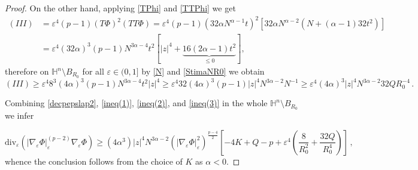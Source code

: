 \documentclass[10pt]{amsart}
\numberwithin{equation}{section}
\theoremstyle{definition}
\newcommand{\eps}{\varepsilon}
\newcommand{\He}{\mathbb{H}}
\begin{document}
\begin{proof}
\noindent On the other hand, applying \eqref{TPhi} and \eqref{TTPhi} we get
\begin{equation}
\label{eq:III}
\begin{aligned}(III) &= \eps^4 (p-1) (T\Phi)^2 (TT\Phi) = \eps^4 (p-1) (32 \alpha N^{\alpha-1}t)^2 \left[32 \alpha N^{\alpha-2} (N+(\alpha-1)32t^2)\right]\\
&= \eps^4 (32 \alpha)^3 (p-1) N^{3\alpha -4} t^2 \left[ |z|^4 + \underbrace{16 (2\alpha -1)t^2}_{\leq 0} \right], 
\end{aligned}
\end{equation}
therefore on $\He^n\setminus B_{R_0}$ for all $\varepsilon \in (0,1]$ by \eqref{N} and \eqref{StimaNR0} we obtain
\begin{equation}
\label{ineq(3)}
(III)\geq \varepsilon^4 8^3 (4\alpha)^3 (p-1) N^{3\alpha-4} t^2 |z|^4\geq \varepsilon^4 32 (4\alpha)^3 (p-1)  |z|^4 N^{3\alpha-2}   N^{-1}\geq  \varepsilon^4 (4\alpha)^3  |z|^4 N^{3\alpha-2} 32 Q   R_0^{-4}\,.
\end{equation}

Combining \eqref{decpepslap2}, \eqref{ineq(1)}, \eqref{ineq(2)}, and \eqref{ineq(3)} in the whole $\He^n\setminus B_{R_0}$ we infer

 \[ \mathrm{div}_{\eps} \left( |\nabla_{\eps} \Phi|_{\eps}^{(p-2)}\nabla_{\eps}\Phi \right) \geq(4\alpha^3) |z|^4 N^{3\alpha-2} \left(|\nabla_{\eps}\Phi|_{\eps}^2 \right)^{\tfrac{p-4}{2}}\left[ -4K+Q-p + \varepsilon^4 \left(\frac{8}{R_0^2} +  \frac{32 Q}{R_0^4} \right) \right] \, ,\]
 whence the conclusion follows from the choice of $K$ as $\alpha<0$.
 \end{proof}
\end{document}
